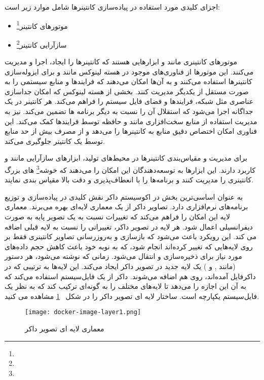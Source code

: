 اجزای کلیدی مورد استفاده در پیاده‌سازی کانتینرها شامل موارد زیر است:
\begin{itemize}
	\item 
	موتورهای کانتینر\footnote{}
	\item
	سازآرایی کانتینر\footnote{}
\end{itemize}


موتورهای کانتینری مانند  و  ابزارهایی هستند که کانتینرها را ایجاد، اجرا و مدیریت می‌کنند. این موتورها از فناوری‌های موجود در هسته لینوکس مانند  و  برای ایزوله‌سازی کانتینرها استفاده می‌کنند و به آن‌ها امکان می‌دهند که فرایندها و منابع سیستمی را به صورت مستقل از یکدیگر مدیریت کنند.  بخشی از هسته لینوکس که امکان جداسازی عناصری مثل شبکه، فرایندها و فضای فایل سیستم را فراهم می‌کند. هر کانتینر در یک  جداگانه اجرا می‌شود که استقلال آن را نسبت به دیگر برنامه ها تضمین می‌کند.  نیز به مدیریت استفاده از منابع سخت‌افزاری مانند  و حافظه توسط فرایندها کمک می‌کند. این فناوری امکان اختصاص دقیق منابع به کانتینرها را می‌دهد و از مصرف بیش از حد منابع توسط یک کانتینر جلوگیری می‌کند.

برای مدیریت و مقیاس‌بندی کانتینرها در محیط‌های تولید، ابزارهای سازآرایی مانند  و  کاربرد دارند. این ابزارها به توسعه‌دهندگان این امکان را می‌دهند که خوشه\footnote{} های  بزرگ کانتینری را مدیریت کنند و برنامه‌ها را با انعطاف‌پذیری و دقت بالا مقیاس بندی نمایند.


 به عنوان اساسی‌ترین بخش در اکوسیستم داکر نقش کلیدی در پیاده‌سازی و توزیع برنامه‌های نرم‌افزاری دارد. تصاویر داکر از یک معماری لایه‌ای بهره می‌برند. معماری لایه این امکان را فراهم می‌کند که تغییرات نسبت به یک تصویر پایه به صورت دیفرانسیلی اعمال شود. هر لایه در تصویر داکر، تغییراتی را نسبت به لایه قبلی اضافه می کند. این رویکرد باعث می‌شود که بازسازی و به‌روزرسانی تصاویر کانتینری فقط بر روی لایه‌هایی که تغییر کرده‌اند انجام شود، که به نوبه خود باعث کاهش حجم داده‌های مورد نیاز برای ذخیره‌سازی و انتقال می‌شود. زمانی که  نوشته می‌شود، هر دستور (مانند ,  و ) یک لایه جدید در تصویر داکر ایجاد می‌کند. این لایه‌ها به ترتیبی که در داکرفایل آمده‌اند، روی هم اضافه می‌شوند. داکر از یک فایل‌سیستم  استفاده می‌کند که به آن این اجازه را می‌دهد تا لایه‌های مختلف را به گونه‌ای ترکیب کند که به نظر یک فایل‌سیستم یکپارچه است. ساختار لایه ای تصویر داکر را در شکل 
~\ref{fig: docker image layer}
 مشاهده می کنید.
\begin{figure}[t]
	\centering
	\texttt{[image: docker-image-layer1.png]}
	\caption{معماری لایه ای تصویر داکر}
	\label{fig: docker image layer}
\end{figure}




